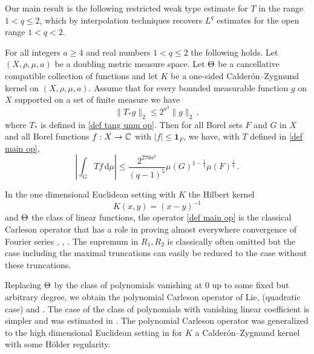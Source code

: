 Our main result  is the following restricted weak type estimate for $T$ in the range $1<q\le 2$, which by interpolation techniques recovers $L^q$ estimates for the open range
$1<q<2$.
\begin{theorem}
\label{metric space Carleson}
    For all  integers $a \ge  4$ and  real numbers $1<q\le 2$
    the following holds.
    Let $(X,\rho,\mu,a)$ be a doubling metric measure space. Let  $\Theta$ be a
    cancellative compatible  collection of functions and let $K$ be a one-sided Calder\'on--Zygmund kernel on $(X,\rho,\mu,a)$. Assume  that for every bounded measurable function $g$ on $X$ supported on a set of finite measure we have
    \begin{equation}\label{nontanbound}
        \|T_{*}g\|_{2} \leq 2^{a^3} \|g\|_2\,,
    \end{equation}
    where $T_{*}$ is defined in
\eqref{def tang unm op}.
    Then for all Borel sets $F$ and $G$ in $X$ and
    all Borel functions $f:X\to \mathbb{C}$ with
    $|f|\le \mathbf{1}_F$, we have, with $T$ defined in  \eqref{def main op},
    \begin{equation}
    \label{resweak}
        \left|\int_{G} T f \, \mathrm{d}\mu\right| \leq \frac{2^{270a^3}}{(q-1)^5} \mu(G)^{1-\frac{1}{q}} \mu(F)^{\frac{1}{q}}\, .
        \end{equation}
\end{theorem}

 In the one dimensional Euclidean setting with $K$ the Hilbert kernel
 \begin{equation*}
 K(x,y)=(x-y)^{-1}
 \end{equation*}
and $\Theta$ the class of linear functions, the operator  \eqref{def main op} is the classical
Carleson operator that has a role in proving
almost everywhere convergence of Fourier series
\cite{carleson}, \cite{fefferman}, \cite{lacey-thiele}.
The supremum in $R_1,R_2$ is classically often omitted but
the case including the maximal truncations can easily be
reduced to the case without these truncations.

Replacing $\Theta$ by the class of polynomials vanishing at $0$
up to some fixed but arbitrary degree,
we obtain the polynomial Carleson operator of Lie,
\cite{lie-quadratic} (quadratic case) and \cite{lie-polynomial}.
 The case of the class of polynomials with
vanishing linear coefficient is simpler and was estimated in \cite{stein-wainger}.
The polynomial Carleson operator was
generalized to the high dimensional Euclidean setting in
\cite{zk-polynomial} for $K$ a Calder\'on--Zygmund kernel with some H\"older regularity.

